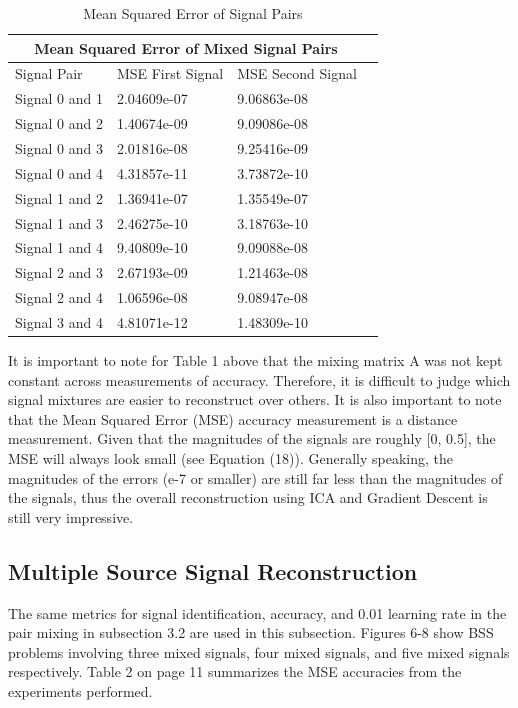 \documentclass[12pt]{article}
\begin{document}
\FloatBarrier
\begin{table}[h!]
\centering
\begin{tabular}{ |p{3cm}||p{3cm}|p{3cm}|p{3cm}|  }
 \hline
 \multicolumn{3}{|c|}{Mean Squared Error of Mixed Signal Pairs} \\
 \hline
 Signal Pair& MSE First Signal & MSE Second Signal\\
 \hline
 Signal 0 and 1& 2.04609e-07& 9.06863e-08\\
 Signal 0 and 2& 1.40674e-09& 9.09086e-08\\
 Signal 0 and 3& 2.01816e-08& 9.25416e-09\\
 Signal 0 and 4& 4.31857e-11& 3.73872e-10\\
 Signal 1 and 2& 1.36941e-07& 1.35549e-07\\
 Signal 1 and 3& 2.46275e-10& 3.18763e-10\\
 Signal 1 and 4& 9.40809e-10& 9.09088e-08\\
 Signal 2 and 3& 2.67193e-09& 1.21463e-08\\
 Signal 2 and 4& 1.06596e-08& 9.08947e-08\\
 Signal 3 and 4& 4.81071e-12& 1.48309e-10\\
 \hline
\end{tabular}
\caption{Mean Squared Error of Signal Pairs}
\end{table}
\FloatBarrier
\noindent
It is important to note for Table 1 above that the mixing matrix A was not kept constant across measurements of accuracy. Therefore, it is difficult to judge which signal mixtures are easier to reconstruct over others. It is also important to note that the Mean Squared Error (MSE) accuracy measurement is a distance measurement. Given that the magnitudes of the signals are roughly [0, 0.5], the MSE will always look small (see Equation (18)). Generally speaking, the magnitudes of the errors (e-7 or smaller) are still far less than the magnitudes of the signals, thus the overall reconstruction using ICA and Gradient Descent is still very impressive.

\subsection{Multiple Source Signal Reconstruction}
The same metrics for signal identification, accuracy, and 0.01 learning rate in the pair mixing in subsection 3.2 are used in this subsection. Figures 6-8 show BSS problems involving three mixed signals, four mixed signals, and five mixed signals respectively. Table 2 on page 11 summarizes the MSE accuracies from the experiments performed.
\end{document}
